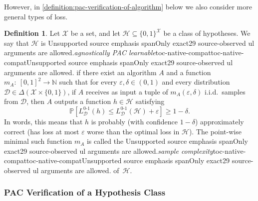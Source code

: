 \documentclass[11pt]{article}
\numberwithin{equation}{section}
\theoremstyle{definition}
\newtheorem{definition}[theorem]{Definition}
\theoremstyle{plain}
\newcommand{\ul}[1]{\begingroup\def\TocFiniteEmphResult{\PackageError{toc-native-compat}{Unsupported source emphasis span}{Only exact29 source-observed ul arguments are allowed.}}\ifstrequal{#1}{total variation distance}{\def\TocFiniteEmphResult{\emph{#1}}}{}\ifstrequal{#1}{$\cH$ shatters $X$}{\def\TocFiniteEmphResult{\emph{#1}}}{}\ifstrequal{#1}{Vapnik--Chervonenkis (VC) dimension of $\cH$}{\def\TocFiniteEmphResult{\emph{#1}}}{}\ifstrequal{#1}{loss function}{\def\TocFiniteEmphResult{\emph{#1}}}{}\ifstrequal{#1}{empirical loss of $h$ with respect to $S$}{\def\TocFiniteEmphResult{\emph{#1}}}{}\ifstrequal{#1}{loss of $h$ with respect to $\cD$}{\def\TocFiniteEmphResult{\emph{#1}}}{}\ifstrequal{#1}{loss of $\cH$ with respect to $\cD$}{\def\TocFiniteEmphResult{\emph{#1}}}{}\ifstrequal{#1}{$0$-$1$ loss}{\def\TocFiniteEmphResult{\emph{#1}}}{}\ifstrequal{#1}{agnostically PAC learnable}{\def\TocFiniteEmphResult{\emph{#1}}}{}\ifstrequal{#1}{sample complexity}{\def\TocFiniteEmphResult{\emph{#1}}}{}\ifstrequal{#1}{PAC verifiable with respect to $\mathbb{D}$ using random samples}{\def\TocFiniteEmphResult{\emph{#1}}}{}\ifstrequal{#1}{proper}{\def\TocFiniteEmphResult{\emph{#1}}}{}\ifstrequal{#1}{proper PAC verifiable}{\def\TocFiniteEmphResult{\emph{#1}}}{}\ifstrequal{#1}{improper}{\def\TocFiniteEmphResult{\emph{#1}}}{}\ifstrequal{#1}{algorithm $A$ with access to oracles $\{\cO_\cD\}_{\cD \in \bbD}$ is PAC verifiable with respect to $\mathbb{D}$ by a verification protocol that uses random samples}{\def\TocFiniteEmphResult{\emph{#1}}}{}\ifstrequal{#1}{$(\tau,T,\delta)$-accurate for $\cX$}{\def\TocFiniteEmphResult{\emph{#1}}}{}\ifstrequal{#1}{$S$ is an $\varepsilon$-sample for $\cD$ with respect to~$\cF$}{\def\TocFiniteEmphResult{\emph{#1}}}{}\ifstrequal{#1}{statistical query}{\def\TocFiniteEmphResult{\emph{#1}}}{}\ifstrequal{#1}{statistical query oracle for $\cD$ with precision $\tau$}{\def\TocFiniteEmphResult{\emph{#1}}}{}\ifstrequal{#1}{statistical query algorithm}{\def\TocFiniteEmphResult{\emph{#1}}}{}\ifstrequal{#1}{transcript}{\def\TocFiniteEmphResult{\emph{#1}}}{}\ifstrequal{#1}{$\sigma$-algebra for $\Omega$}{\def\TocFiniteEmphResult{\emph{#1}}}{}\ifstrequal{#1}{$\sigma$-algebra generated by $\cA$ for $\Omega$}{\def\TocFiniteEmphResult{\emph{#1}}}{}\ifstrequal{#1}{$\sigma$-algebra generated by $\cF$ for $\Omega$}{\def\TocFiniteEmphResult{\emph{#1}}}{}\ifstrequal{#1}{atoms of $\cS$}{\def\TocFiniteEmphResult{\emph{#1}}}{}\ifstrequal{#1}{partition size of $\cF$}{\def\TocFiniteEmphResult{\emph{#1}}}{}\ifstrequal{#1}{efficiently evaluable}{\def\TocFiniteEmphResult{\emph{#1}}}{}\ifstrequal{#1}{efficiently manipulable}{\def\TocFiniteEmphResult{\emph{#1}}}{}\ifstrequal{#1}{$\varepsilon$-maximizing with respect to $A$ and $\bbD$}{\def\TocFiniteEmphResult{\emph{#1}}}{}\TocFiniteEmphResult\endgroup}
\theoremstyle{definition}\newtheorem{notation}[theorem]{Notation}\theoremstyle{plain}\raggedbottom
\newcommand{\roundBrackets}[1]{
	\mathopen{}\left(#1\right)\mathclose{}
}
\newcommand{\squareBrackets}[1]{
	\mathopen{}\left[#1\right]\mathclose{}
}
\newcommand{\customFunctionSquare}[2]{
	#1\squareBrackets{#2}
}
\newcommand{\bbFunction}[2]{
	\customFunctionSquare{\mathbb{#1}}{#2}
}
\newcommand{\PP}[1]{\bbFunction{P}{#1}}
\newcommand{\LossIndicator}[2]{\LossIndicatorNameEmpty_{#1}\roundBrackets{#2}}
\newcommand{\LossIndicatorNameEmpty}{L^{0\text{-}1}}
\newcommand{\bbD}{\mathbb{D}}
\newcommand{\bbN}{\mathbb{N}}
\newcommand{\cA}{\mathcal{A}}
\newcommand{\cD}{\mathcal{D}}
\newcommand{\cF}{\mathcal{F}}
\newcommand{\cH}{\mathcal{H}}
\newcommand{\cO}{\mathcal{O}}
\newcommand{\cS}{\mathcal{S}}
\newcommand{\cX}{\mathcal{X}}
\newcommand{\1}{\mathds{1}}
\newcommand{\mA}{m_{\scriptscriptstyle A}}
\begin{document}
However, in \cref{definition:pac-verification-of-algorithm} below we also consider more general types of loss. 

\begin{definition}
	Let $\cX$ be a set, and let $\cH \subseteq \{0,1\}^\cX$ be a class of hypotheses. We say that $\cH$ is \ul{agnostically PAC learnable} if there exist an algorithm $A$ and a function $\mA:~[0,1]^2 \rightarrow \bbN$ such that for every $\varepsilon,\delta \in (0,1)$ and every distribution ${\cD \in \Delta(\cX \times \{0,1\})}$, if $A$ receives as input a tuple of $\mA(\varepsilon,\delta)$ i.i.d.\ samples from $\cD$, then $A$ outputs a function $h \in \cH$ satisfying
	\[
	\PP{\LossIndicator{\cD}{h} \leq \LossIndicator{\cD}{\cH} + \varepsilon} \geq 1-\delta.
	\]
	In words, this means that $h$ is probably (with confidence $1-\delta$) approximately correct (has loss at most $\varepsilon$ worse than the optimal loss in $\cH$). The point-wise minimal such function $\mA$ is called the \ul{sample complexity} of~$\cH$.
\end{definition}

\subsubsection*{PAC Verification of a Hypothesis Class}
\end{document}
